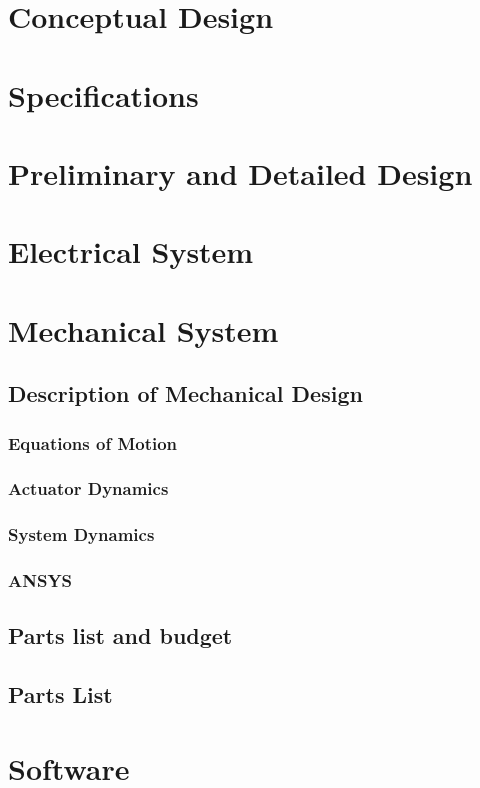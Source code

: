 

\normalem


\section{Conceptual Design}

\newpage
\section{Specifications}

\newpage
\section{Preliminary and Detailed Design}
\section{Electrical System}
\section{Mechanical System}
\subsection*{Description of Mechanical Design}

\subsubsection*{Equations of Motion}

\subsubsection*{Actuator Dynamics}

\subsubsection*{System Dynamics}

\newpage
\subsubsection*{ANSYS}

\newpage
\subsection*{Parts list and budget}
\subsection*{Parts List}

\section{Software}
